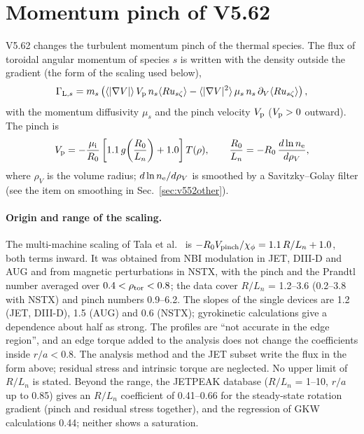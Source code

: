 \documentclass[11pt]{article}
\def\r#1{{\rm#1}}
\def\aves#1{\langle#1\rangle}
\begin{document}
\clearpage
\section{Momentum pinch of V5.62}
\setcounter{equation}{0}
\label{sec:v562}

V5.62 changes the turbulent momentum pinch of the thermal species.  The flux of
toroidal angular momentum of species $s$ is written with the density outside the
gradient (the form of the scaling used below),
\begin{equation}
  \Gamma_{\r{L},s} = m_s\left(\aves{|\nabla V|}\,V_\r{p}\,n_s\aves{Ru_{s\zeta}}
   - \aves{|\nabla V|^2}\,\mu_s\,n_s\,\partial_V\aves{Ru_{s\zeta}}\right),
\end{equation}
with the momentum diffusivity $\mu_s$ and the pinch velocity $V_\r{p}$ ($V_\r{p}>0$
outward).  The pinch is
\begin{equation}
  V_\r{p} = -\frac{\mu_\r{i}}{R_0}\left[1.1\,g\!\left(\frac{R_0}{L_n}\right) + 1.0\right] T(\rho),
  \qquad \frac{R_0}{L_n} = -R_0\,\frac{d\ln n_\r{e}}{d\rho_V},
  \label{eq:v562pinch}
\end{equation}
where $\rho_V$ is the volume radius; $d\ln n_\r{e}/d\rho_V$ is smoothed by a Savitzky--Golay
filter (see the item on smoothing in Sec.~\ref{sec:v552other}).

\paragraph{Origin and range of the scaling.}  The multi-machine scaling of Tala
et al.\ \cite{Tala2012} is $-R_0V_\r{pinch}/\chi_\phi = 1.1\,R/L_n + 1.0$, both terms
inward.  It was obtained from NBI modulation in JET, DIII-D and AUG and from
magnetic perturbations in NSTX, with the pinch and the Prandtl number averaged over
$0.4<\rho_\r{tor}<0.8$; the data cover $R/L_n$ = 1.2--3.6 (0.2--3.8 with NSTX) and
pinch numbers 0.9--6.2.  The slopes of the single devices are 1.2 (JET, DIII-D), 1.5
(AUG) and 0.6 (NSTX); gyrokinetic calculations give a dependence about half as strong.
The profiles are ``not accurate in the edge region'', and an edge torque added to the
analysis does not change the coefficients inside $r/a<0.8$.  The analysis method
\cite{Mantica2010} and the JET subset \cite{Tala2011} write the flux in the form
above; residual stress and intrinsic torque are neglected.  No upper limit of $R/L_n$
is stated.  Beyond the range, the JETPEAK database \cite{Weisen2012} ($R/L_n$ = 1--10,
$r/a$ up to 0.85) gives an $R/L_n$ coefficient of 0.41--0.66 for the steady-state
rotation gradient (pinch and residual stress together), and the regression of GKW
calculations 0.44; neither shows a saturation.
\end{document}
